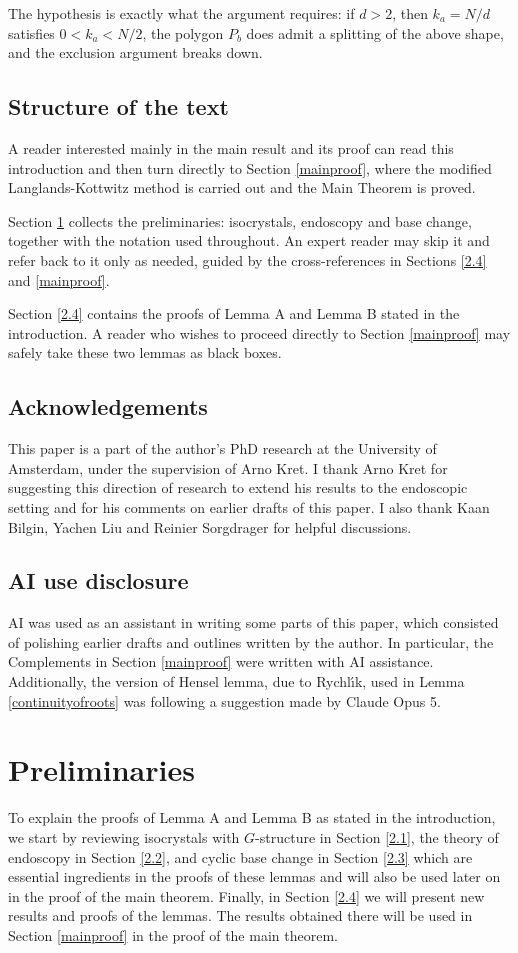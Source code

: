 \documentclass[11pt,a4paper]{article}
\theoremstyle{definition}
\theoremstyle{plain}
\theoremstyle{remark}
\theoremstyle{plain}
\begin{document}
The hypothesis is exactly what the argument requires: if $d>2$, then $k_a=N/d$ satisfies $0<k_a<N/2$, the polygon $P_b$ does admit a splitting of the above shape, and the exclusion argument breaks down.

\subsection*{Structure of the text}
A reader interested mainly in the main result and its proof can read this introduction and then turn directly to Section \ref{mainproof}, where the modified Langlands-Kottwitz method is carried out and the Main Theorem is proved.

Section \ref{prelim} collects the preliminaries: isocrystals, endoscopy and base change, together with the notation used throughout. An expert reader may skip it and refer back to it only as needed, guided by the cross-references in Sections \ref{2.4} and \ref{mainproof}.

Section \ref{2.4} contains the proofs of Lemma A and Lemma B stated in the introduction. A reader who wishes to proceed directly to Section \ref{mainproof} may safely take these two lemmas as black boxes.

\subsection*{Acknowledgements}
This paper is a part of the author's PhD research at the University of Amsterdam, under the supervision of Arno Kret. I thank Arno Kret for suggesting this direction of research to extend his results to the endoscopic setting and for his comments on earlier drafts of this paper. I also thank Kaan Bilgin, Yachen Liu and Reinier Sorgdrager for helpful discussions.

\subsection*{AI use disclosure}
AI was used as an assistant in writing some parts of this paper, which consisted of polishing earlier drafts and outlines written by the author. In particular, the Complements in Section \ref{mainproof} were written with AI assistance. Additionally, the version of Hensel lemma, due to Rychl\'{\i}k, used in Lemma \ref{continuityofroots} was following a suggestion made by Claude Opus 5.

\section{Preliminaries}\label{prelim}
To explain the proofs of Lemma A and Lemma B as stated in the introduction, we start by reviewing isocrystals with $G$-structure in Section \ref{2.1}, the theory of endoscopy in Section \ref{2.2}, and cyclic base change in Section \ref{2.3} which are essential ingredients in the proofs of these lemmas and will also be used later on in the proof of the main theorem. Finally, in Section \ref{2.4} we will present new results and proofs of the lemmas. The results obtained there will be used in Section \ref{mainproof} in the proof of the main theorem.
\end{document}
